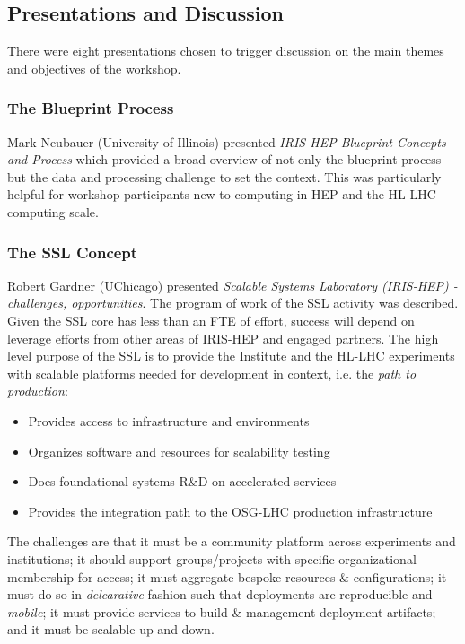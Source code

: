 \documentclass[11pt,letterpaper,fleqn]{article}
\begin{document}
\subsection{Presentations and Discussion}

There were eight presentations chosen to trigger discussion on the main themes and objectives of the workshop.


\subsubsection{The Blueprint Process}
Mark Neubauer (University of Illinois) presented {\it IRIS-HEP Blueprint Concepts and Process} which provided a broad overview of not only the blueprint process but the data and processing challenge to set the context. This was particularly helpful for workshop participants new to computing in HEP and the HL-LHC computing scale.

\subsubsection{The SSL Concept}
Robert Gardner (UChicago) presented {\it Scalable Systems Laboratory (IRIS-HEP) - challenges, opportunities}.  The program of work of the SSL activity was described.  Given the SSL core has less than an FTE of effort, success will depend on leverage efforts from other areas of IRIS-HEP and engaged partners. The high level purpose of the SSL is to provide the Institute and the HL-LHC experiments with scalable platforms needed for development in context, i.e. the {\it path to production}:

\begin{itemize}
  \item Provides access to infrastructure and environments
  \item Organizes software and resources for scalability testing
  \item Does foundational systems R\&D on accelerated services
  \item Provides the integration path to the OSG-LHC production infrastructure
\end{itemize}

The challenges are that it must be a community platform across experiments and institutions; it should support groups/projects with specific organizational membership for access; it must aggregate bespoke resources \& configurations; it must do so in {\it delcarative} fashion such that deployments are reproducible and {\it mobile}; it must provide services to build \& management deployment artifacts; and it must be scalable up and down.
\end{document}
